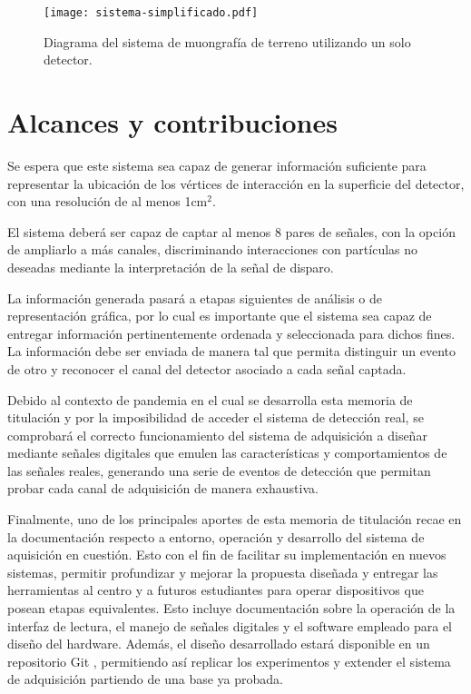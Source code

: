	\begin{figure}[t]
		\centering
		\texttt{[image: sistema-simplificado.pdf]}
		\caption{Diagrama del sistema de muongrafía de terreno utilizando un solo detector.}
		\label{img:sistema}
	\end{figure}						

\section{Alcances y contribuciones}

	Se espera que este sistema sea capaz de generar información suficiente para representar la ubicación de los vértices de interacción en la superficie del detector, con una resolución de al menos 1cm$^2$.
	
	El sistema deberá ser capaz de captar al menos 8 pares de señales, con la opción de ampliarlo a más canales, discriminando interacciones con partículas no deseadas mediante la interpretación de la señal de disparo.
	
	La información generada pasará a etapas siguientes de análisis o de representación gráfica, por lo cual es importante que el sistema sea capaz de entregar información pertinentemente ordenada y seleccionada para dichos fines. La información debe ser enviada de manera tal que permita distinguir un evento de otro y reconocer el canal del detector asociado a cada señal captada.
	
	Debido al contexto de pandemia en el cual se desarrolla esta memoria de titulación y por la imposibilidad de acceder el sistema de detección real, se comprobará el correcto funcionamiento del sistema de adquisición a diseñar mediante señales digitales que emulen las características y comportamientos de las señales reales, generando una serie de eventos de detección que permitan probar cada canal de adquisición de manera exhaustiva.
	
	Finalmente, uno de los principales aportes de esta memoria de titulación recae en la documentación respecto a entorno, operación y desarrollo del sistema de aquisición en cuestión. Esto con el fin de facilitar su implementación en nuevos sistemas, permitir profundizar y mejorar la propuesta diseñada y entregar las herramientas al centro y a futuros estudiantes para operar dispositivos que posean etapas equivalentes. Esto incluye documentación sobre la operación de la interfaz de lectura, el manejo de señales digitales y el software empleado para el diseño del hardware. Además, el diseño desarrollado estará disponible en un repositorio Git \cite{GonzalezMuonRepository}, permitiendo así replicar los experimentos y extender el sistema de adquisición partiendo de una base ya probada.

